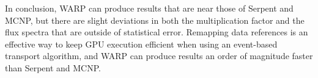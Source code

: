 In conclusion, WARP can produce results that are near those of Serpent and MCNP, but there are slight deviations in both the multiplication factor and the flux spectra that are outside of statistical error.  Remapping data references is an effective way to keep GPU execution efficient when using an event-based transport algorithm, and WARP can produce results an order of magnitude faster than Serpent and MCNP.




